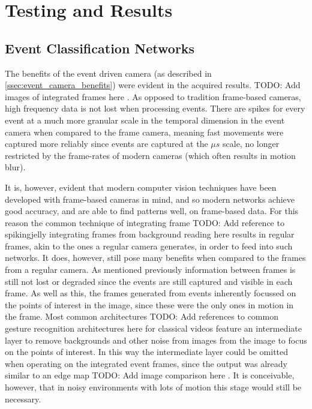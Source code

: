 \chapter{Testing and Results} \label{chap:testing_and_results}

\section{Event Classification Networks}

The benefits of the event driven camera (as described in \cref{ssec:event_camera_benefits}) were evident in the acquired results. \color{red} TODO: Add images of integrated frames here \color{black}. As opposed to tradition frame-based cameras, high frequency data is not lost when processing events. There are spikes for every event at a much more granular scale in the temporal dimension in the event camera when compared to the frame camera, meaning fast movements were captured more reliably since events are captured at the $\mu s$ scale, no longer restricted by the frame-rates of modern cameras (which often results in motion blur).

It is, however, evident that modern computer vision techniques have been developed with frame-based cameras in mind, and so modern networks achieve good accuracy, and are able to find patterns well, on frame-based data. For this reason the common technique of integrating frame \color{red} TODO: Add reference to spikingjelly integrating frames from background reading here \color{black} results in regular frames, akin to the ones a regular camera generates, in order to feed into such networks. It does, however, still pose many benefits when compared to the frames from a regular camera. As mentioned previously information between frames is still not lost or degraded since the events are still captured and visible in each frame. As well as this, the frames generated from events inherently focussed on the points of interest in the image, since these were the only ones in motion in the frame. Most common architectures \color{red} TODO: Add references to common gesture recognition architectures here \color{black} for classical videos feature an intermediate layer to remove backgrounds and other noise from images from the image to focus on the points of interest. In this way the intermediate layer could be omitted when operating on the integrated event frames, since the output was already similar to an edge map \color{red} TODO: Add image comparison here \color{black}. It is conceivable, however, that in noisy environments with lots of motion this stage would still be necessary.

